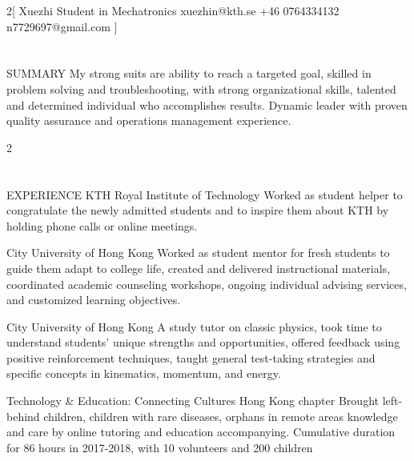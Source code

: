 \documentclass{my_cv}
\begin{document}
\begin{multicols}{2}[
        {Xuezhi}%
        {Student in Mechatronics}%
        {xuezhin@kth.se}%
        {+46 0764334132}%
        {n7729697@gmail.com}%
        {}%
]
\end{multicols}

\section{\faFileText}{SUMMARY}
My strong suits are ability to reach a targeted goal, skilled in problem solving and troubleshooting, with strong organizational skills, talented and determined individual who accomplishes results. Dynamic leader with proven quality assurance and operations management experience.

\begin{multicols}{2}
\section{\faPencil}{EXPERIENCE}
%
    {KTH Royal Institute of Technology}%
    {Worked as student helper to congratulate the newly admitted students and to inspire them about KTH by holding phone calls or online meetings.}%
   
%
    {City University of Hong Kong}%
    {Worked as student mentor for fresh students to guide them adapt to college life, created and delivered instructional materials, coordinated academic counseling workshops, ongoing individual advising services, and customized learning objectives.}%

%
    {City University of Hong Kong}%
    {A study tutor on classic physics, took time to understand students’ unique strengths and opportunities, offered feedback using positive reinforcement techniques, taught general test-taking strategies and specific concepts in kinematics, momentum, and energy. }%
     
%
    {Technology \& Education: Connecting Cultures Hong Kong chapter}%
    {Brought left-behind children, children with rare diseases, orphans in remote areas knowledge and care by online tutoring and education accompanying. Cumulative duration for 86 hours in 2017-2018, with 10 volunteers and 200 children}%
    
    
    

\end{multicols}
\end{document}
